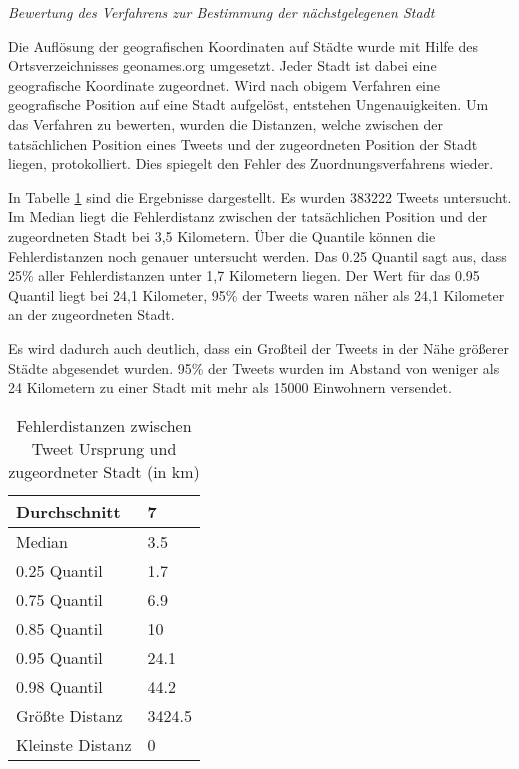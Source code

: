 			\textit{Bewertung des Verfahrens zur Bestimmung der nächstgelegenen Stadt}

				Die Auflösung der geografischen Koordinaten auf Städte wurde mit Hilfe des Ortsverzeichnisses geonames.org umgesetzt.
				Jeder Stadt ist dabei eine geografische Koordinate zugeordnet.
				Wird nach obigem Verfahren eine geografische Position auf eine Stadt aufgelöst, entstehen Ungenauigkeiten.
				Um das Verfahren zu bewerten, wurden die Distanzen, welche zwischen der tatsächlichen Position eines Tweets und der zugeordneten Position der Stadt liegen, protokolliert. 
				Dies spiegelt den Fehler des Zuordnungsverfahrens wieder.

				In Tabelle \ref{tab:distances} sind die Ergebnisse dargestellt.
				Es wurden 383222 Tweets untersucht.
				Im Median liegt die Fehlerdistanz zwischen der tatsächlichen Position und der zugeordneten Stadt bei 3,5 Kilometern.
				Über die Quantile können die Fehlerdistanzen noch genauer untersucht werden.
				Das 0.25 Quantil sagt aus, dass 25\% aller Fehlerdistanzen unter 1,7 Kilometern liegen.
				Der Wert für das 0.95 Quantil liegt bei 24,1 Kilometer, 95\% der Tweets waren näher als 24,1 Kilometer an der zugeordneten Stadt. 
				
				Es wird dadurch auch deutlich, dass ein Großteil der Tweets in der Nähe größerer Städte abgesendet wurden. 
				95\% der Tweets wurden im Abstand von weniger als 24 Kilometern zu einer Stadt mit mehr als 15000 Einwohnern versendet.

					\begin{table}[h]
					\centering
					\caption{Fehlerdistanzen zwischen Tweet Ursprung und zugeordneter Stadt (in km)}
					\label{tab:distances}
					\begin{tabular}{|l|l|}
					\hline
					Durchschnitt & 7      \\ \hline
					Median       & 3.5    \\ \hline
					0.25 Quantil & 1.7    \\ \hline
					0.75 Quantil & 6.9    \\ \hline
					0.85 Quantil & 10     \\ \hline
					0.95 Quantil & 24.1   \\ \hline
					0.98 Quantil & 44.2   \\ \hline
					Größte Distanz      & 3424.5 \\ \hline
					Kleinste Distanz     & 0     \\ \hline
					\end{tabular}
					\end{table}

